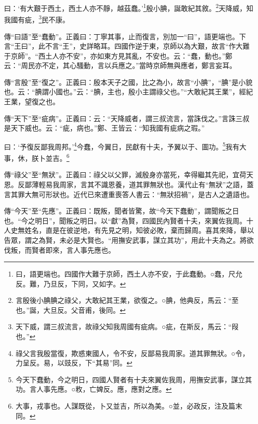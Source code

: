 曰：‘有大艱于西土，西土人亦不靜，越茲蠢。’\footnote{曰，語更端也。四國作大難于京師，西土人亦不安，于此蠢動。○蠢，尺允反。難，乃旦反，下同，又如字。}殷小腆，誕敢紀其敘。\footnote{言殷後小腆腆之祿父，大敢紀其王業，欲復之。○腆，他典反，馬云：“至也。”誕，大旦反。父音甫，後同。}天降威，知我國有疵，\footnote{天下威，謂三叔流言，故祿父知我周國有疵病。○疵，在斯反，馬云：“叚也。”}民不康。


{\noindent\zhuan{}\fzbyks 傳“曰語”至“蠢動”。正義曰：丁寧其事，止而復言，別加一“曰”，語更端也。下言“王曰”，此不言“王”，史詳略耳。四國作逆于東，京師以為大艱，故言“作大難于京師”。“西土人亦不安”，亦如東方見其亂，不安也。云：“蠢，動也。”鄭云：“周民亦不定，其心騷動，言以兵應之。”當時京師無與應者，鄭言妄耳。 \par}

{\noindent\zhuan{}\fzbyks 傳“言殷”至“復之”。正義曰：殷本天子之國，比之為小，故言“小腆”，“腆”是小貌也。云：“腆謂小國也。”云：“腆，主也，殷小主謂祿父也。”“大敢紀其王業”，經紀王業，望復之也。 \par}

{\noindent\zhuan{}\fzbyks 傳“天下”至“疵病”。正義曰：云：“天降威者，謂三叔流言，當誅伐之。”言誅三叔是天下威也。云：“疵，病也。”鄭、王皆云：“知我國有疵病之瑕。” \par}

曰：‘予復反鄙我周邦。’\footnote{祿父言我殷當復，欺惑東國人，令不安，反鄙易我周家。道其罪無狀。○令，力呈反。易，以豉反，下“其易”同。}今蠢，今翼日，民獻有十夫，予翼以于、圖功。\footnote{今天下蠢動，今之明日，四國人賢者有十夫來翼佐我周，用撫安武事，謀立其功。言人事先應。○敉，亡婢反。應，應對之應。}我有大事，休，朕卜並吉。\footnote{大事，戎事也。人謀既從，卜又並吉，所以為美。○並，必政反，注及篇末同。}

{\noindent\zhuan{}\fzbyks 傳“祿父”至“無狀”。正義曰：祿父以父罪，滅殷身亦當死，幸得繼其先祀，宜荷天恩。反鄙薄輕易我周家，言其不識恩養，道其罪無狀也。漢代止有“無狀”之語，蓋言其罪大無可形狀也。近代已來遭重喪答人書云：“無狀招禍”，是古人之遺語也。 \par}

{\noindent\zhuan{}\fzbyks 傳“今天”至“先應”。正義曰：既叛，聞者皆驚，故“今天下蠢動”，謂聞叛之日也。“今之明日”，聞叛之明日。以“獻”為賢，四國民內賢者十夫，來翼佐我周。十人史無姓名，直是在彼逆地，有先見之明，知彼必敗，棄而歸周。喜其來降，舉以告眾，謂之為賢，未必是大賢也。“用撫安武事，謀立其功”，用此十夫為之。將欲伐叛，而賢者即來，言人事先應也。 \par}

